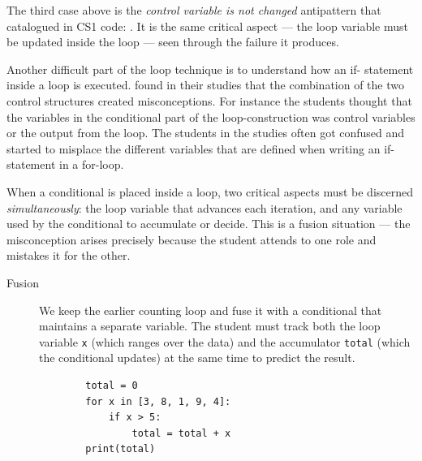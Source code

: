 The third case above is the \emph{control variable is not changed} antipattern
that \textcite{Bosse2021Antipatterns} catalogued in CS1 code:
. It is the same critical
aspect --- the loop variable must be updated inside the loop --- seen through the
failure it produces.

Another difficult part of the loop technique is to understand how an if-
statement inside a loop is executed. \textcite{Sekiya2013} found in their 
studies that the combination of the two control structures created 
misconceptions. For instance the students thought that the variables in the 
conditional part of the loop-construction was control variables or the 
output from the loop. The students in the studies often got confused and 
started to misplace the different variables that are defined when writing 
an if-statement in a for-loop.

When a conditional is placed inside a loop, two critical aspects must be
discerned \emph{simultaneously}: the loop variable that advances each iteration,
and any variable used by the conditional to accumulate or decide. This is a
fusion situation --- the misconception arises precisely because the student
attends to one role and mistakes it for the other.

\begin{description}
  \item[Fusion] We keep the earlier counting loop and fuse it with a conditional
    that maintains a separate variable. The student must track both the loop
    variable \texttt{x} (which ranges over the data) and the
    accumulator \texttt{total} (which the conditional updates) at the
    same time to predict the result.

    \hfill
    \begin{minipage}[t]{0.55\columnwidth}
      \begin{verbatim}
        total = 0
        for x in [3, 8, 1, 9, 4]:
            if x > 5:
                total = total + x
        print(total)
      \end{verbatim}
    \end{minipage}
\end{description}

